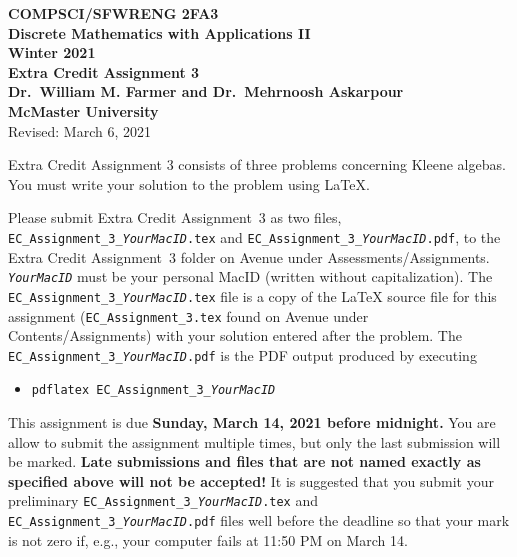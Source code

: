 \documentclass[11pt,fleqn]{article}
\newcommand{\bsp}{\begin{sloppypar}}
\newcommand{\esp}{\end{sloppypar}}
\begin{document}
\begin{center}

  {\large \textbf{COMPSCI/SFWRENG 2FA3}}\\[2mm]
  {\large \textbf{Discrete Mathematics with Applications II}}\\[2mm]
  {\large \textbf{Winter 2021}}\\[8mm]
  {\huge \textbf{Extra Credit Assignment 3}}\\[6mm]
{\large \textbf{Dr.~William M. Farmer and Dr.~Mehrnoosh Askarpour}}\\[2mm]
  {\large \textbf{McMaster University}}\\[6mm]
  {\large Revised: March 6, 2021}

\end{center}

\medskip

Extra Credit Assignment 3 consists of three problems concerning Kleene
algebas.  You must write your solution to the problem using LaTeX.

\bsp
Please submit Extra Credit Assignment~3 as two files,
\texttt{EC\_Assignment\_3\_\emph{YourMacID}.tex} and
\texttt{EC\_Assignment\_3\_\emph{YourMacID}.pdf}, to the Extra Credit
Assignment~3 folder on Avenue under Assessments/Assignments.
\texttt{\emph{YourMacID}} must be your personal MacID (written without
capitalization).  The \texttt{EC\_Assignment\_3\_\emph{YourMacID}.tex}
file is a copy of the LaTeX source file for this assignment
(\texttt{EC\_Assignment\_3.tex} found on Avenue under
Contents/Assignments) with your solution entered after the problem.
The \texttt{EC\_Assignment\_3\_\emph{YourMacID}.pdf} is the PDF output
produced by executing
\esp

\begin{itemize}

  \item[] \texttt{pdflatex EC\_Assignment\_3\_\emph{YourMacID}}

\end{itemize}

This assignment is due \textbf{Sunday, March 14, 2021 before
	midnight.} You are allow to submit the assignment multiple times,
but only the last submission will be marked.  \textbf{Late submissions
  and files that are not named exactly as specified above will not be
  accepted!}  It is suggested that you submit your preliminary
\texttt{EC\_Assignment\_3\_\emph{YourMacID}.tex} and
\texttt{EC\_Assignment\_3\_\emph{YourMacID}.pdf} files well before the
deadline so that your mark is not zero if, e.g., your computer fails
at 11:50 PM on March 14.
\end{document}
